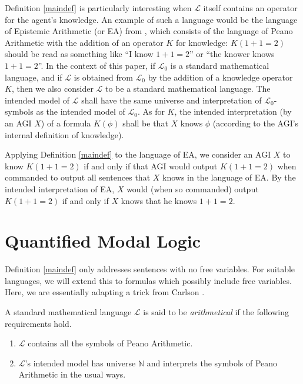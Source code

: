 \documentclass[runningheads]{llncs}
\begin{document}
Definition \ref{maindef} is particularly interesting when $\mathscr L$ itself
contains an operator for the agent's knowledge. An example of such a language would be
the language of Epistemic Arithmetic (or EA) from \cite{shapiro}, which consists of the
language of Peano Arithmetic with the addition of an operator $K$ for knowledge:
$K(1+1=2)$ should be read as something like
``I know $1+1=2$'' or ``the knower knows $1+1=2$''. In the context of this paper,
if $\mathscr L_0$ is a standard mathematical language, and if $\mathscr L$ is obtained
from $\mathscr L_0$ by the addition of a knowledge operator $K$, then we also
consider $\mathscr L$ to be a standard mathematical language. The intended model
of $\mathscr L$ shall have the same universe and interpretation of
$\mathscr L_0$-symbols as the intended model of $\mathscr L_0$. As for $K$,
the intended interpretation (by an AGI $X$) of a formula $K(\phi)$ shall be
that $X$ knows $\phi$ (according to the AGI's internal definition of knowledge).

\begin{example}
Applying Definition \ref{maindef} to the language of EA,
we consider an AGI $X$ to know $K(1+1=2)$ if and only if that AGI would output
$K(1+1=2)$ when commanded to output all sentences that $X$ knows in the language of
EA. By the intended interpretation of
EA, $X$ would (when so commanded)
output $K(1+1=2)$ if and only if $X$ knows that he knows $1+1=2$.
\end{example}

\section{Quantified Modal Logic}
\label{quantifiedsection}

Definition \ref{maindef} only addresses sentences with no free variables.
For suitable languages, we will extend this to formulas which possibly include
free variables. Here, we are essentially adapting a trick from
Carlson \cite{carlson}.

\begin{definition}
  A standard mathematical language $\mathscr L$ is said to be \emph{arithmetical}
  if the following requirements hold.
  \begin{enumerate}
    \item $\mathscr L$ contains all the symbols of Peano Arithmetic.
    \item $\mathscr L$'s intended model has universe $\mathbb N$ and interprets
    the symbols of Peano Arithmetic in the usual ways.
  \end{enumerate}
\end{definition}
\end{document}
